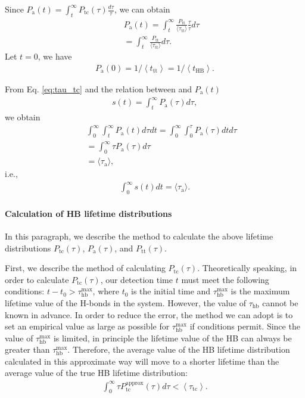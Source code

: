 {Since $P_{\mathrm{a}}(t)=\int_{t}^{\infty} P_{\mathrm{tc}}(\tau) \frac{d \tau}{\tau}$,
we can obtain
\begin{eqnarray}
&& P_{\mathrm{a}}(t)=\int_t^\infty \frac{P_\text{tt}}{\langle\tau_\text{tt}\rangle} \frac{\tau}{\tau} d\tau \nonumber \\
&& =  \int_t^\infty \frac{P_\text{tt}}{\langle\tau_\text{tt}\rangle}d\tau. \nonumber
\label{eq:P_a}
\end{eqnarray}
Let $t=0$, we have 
\begin{eqnarray}
P_{\mathrm{a}}(0)=1 /\left\langle t_{\mathrm{tt}}\right\rangle = 1 /\left\langle t_{\mathrm{HB}}\right\rangle.
\label{eq:P_a0}
\end{eqnarray}

From Eq. \ref{eq:tau_tc} and the relation between \SHB and $P_{\mathrm{a}}(t)$
\begin{eqnarray}
s(t)=\int_{t}^{\infty} P_{\mathrm{a}}(\tau) d \tau,
\label{eq:P_a}
\end{eqnarray}
we obtain
%
\begin{eqnarray}
&&\int_{0}^{\infty} \int_{t}^{\infty} P_\text{a}(t) d \tau d t = \int_{0}^{\infty} \int_{0}^{\tau} P_\text{a}(\tau) d t d \tau \nonumber \\
&& = \int_{0}^{\infty} \tau P_\text{a}(\tau) d \tau \nonumber \\
&& = \langle \tau_{\mathrm{a}} \rangle, \nonumber
\end{eqnarray}
i.e., 
\begin{eqnarray}
\int_{0}^{\infty} s(t) d t = \langle \tau_{\mathrm{a}} \rangle.
\label{eq:int_Ca}
\end{eqnarray}
\paragraph{Calculation of HB lifetime distributions}
In this paragraph, we describe the method to calculate the above lifetime distributions $P_\text{tc}(\tau)$, $P_\text{a}(\tau)$, and $P_\text{tt}(\tau)$.

First, we describe the method of calculating $P_\text{tc}(\tau)$.
Theoretically speaking, in order to calculate $P_\text{tc}(\tau)$, our detection time $t$ must meet the following conditions: 
$t-t_0 > \tau_\text{hb}^{\max}$, where $t_0$ is the initial time and $\tau_\text{hb}^{\max}$ is the maximum lifetime value of the H-bonds in the system. 
However, the value of $\tau_\text{hb}$ cannot be known in advance. 
In order to reduce the error, the method we can adopt is to set an empirical value as large as possible for
 $\tau_\text{hb}^{\max}$ if conditions permit. Since the value of $\tau_\text{hb}^{\max}$ is limited, in principle the lifetime value of the HB 
can always be greater than $\tau_\text{hb}^{\max}$. 
Therefore, the average value of the HB lifetime distribution 
calculated in this approximate way will move to a shorter lifetime than the average value of the true HB lifetime distribution:
\begin{eqnarray}
\int_{0}^{\infty} \tau P_{\mathrm{tc}}^{\mathrm{approx}}(\tau) d \tau < \left\langle\tau_{\mathrm{tc}}\right\rangle.
\label{eq:upper_bound_1_for_tau_tc}
\end{eqnarray} 

}
